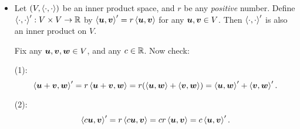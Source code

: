 \begin{enumerate}
\begin{itemize}
\begin{pf}
Fix any \(\vect{u}=\mqty[u_1&\cdots&u_n]^{T}\),
\(\vect{v}=\mqty[v_1&\cdots&v_n]^{T}\), and
\(\vect{w}=\mqty[w_1&\cdots&w_n]^{T}\) in \(\R^n\), and any \(c\in\R\). Now
check:

(1):
\begin{align*}
\inner{\vect{u}+\vect{v}}{\vect{w}}
&=(u_1+v_1)w_1+\dotsb+(u_n+v_n)w_n \\
&=(u_1w_1+\dotsb+u_nw_n)+(v_1w_1+\dotsb+v_nw_n) \\
&=\inner{\vect{u}}{\vect{w}}+\inner{\vect{v}}{\vect{w}}.
\end{align*}

(2):
\begin{align*}
\inner{c\vect{u}}{\vect{v}}
&=(cu_1)v_1+\dotsb+(cu_n)v_n \\
&=c(u_1v_1+\dotsb+u_nv_n) \\
&=c\inner{\vect{u}}{\vect{v}}.
\end{align*}

(3):

\begin{align*}
\inner{\vect{u}}{\vect{v}}
&=(cu_1)v_1+\dotsb+(cu_n)v_n \\
&=u_1v_1+\dotsb+u_nv_n \\
&=v_1u_1+\dotsb+v_nu_n \\
&=\inner{\vect{v}}{\vect{u}}.
\end{align*}

(4): When \(\vect{v}\ne\vect{0}\),
\[
\inner{\vect{v}}{\vect{v}}=v_1^2+\dotsb+v_n^2>0
\]
(since at least one of the \(n\) terms is positive, and all the \(n\) terms are
nonnegative).
\end{pf}
\item Let \((V,\left\langle \cdot,\cdot\right\rangle)\) be an inner product space, and \(r\) be
any \emph{positive} number. Define \(\left\langle \cdot,\cdot\right\rangle':V\times V\to\mathbb{R}\) by
\(\left\langle \vb*{u},\vb*{v}\right\rangle'=r\left\langle \vb*{u},\vb*{v}\right\rangle\) for any
\(\vb*{u},\vb*{v}\in V\). Then \(\left\langle \cdot,\cdot\right\rangle'\) is also an inner product on \(V\).

\begin{pf}
Fix any \(\vb*{u},\vb*{v},\vb*{w}\in V\), and any \(c\in\R\). Now check:

(1):
\[
\left\langle \vb*{u}+\vb*{v},\vb*{w}\right\rangle'
=r\left\langle \vb*{u}+\vb*{v},\vb*{w}\right\rangle
=r(\left\langle \vb*{u},\vb*{w}\right\rangle+\left\langle \vb*{v},\vb*{w}\right\rangle)
=\left\langle \vb*{u},\vb*{w}\right\rangle'+\left\langle \vb*{v},\vb*{w}\right\rangle'.
\]

(2):
\[
\left\langle c\vb*{u},\vb*{v}\right\rangle'
=r\left\langle c\vb*{u},\vb*{v}\right\rangle
=cr\left\langle \vb*{u},\vb*{v}\right\rangle
=c\left\langle \vb*{u},\vb*{v}\right\rangle'.
\]


\end{pf}
\end{itemize}
\end{enumerate}
